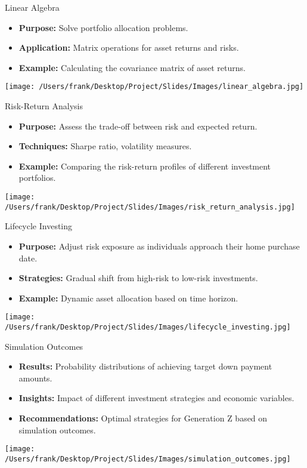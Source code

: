 \documentclass{beamer}
\begin{document}
\begin{frame}{Linear Algebra}
    \begin{itemize}
        \item \textbf{Purpose:} Solve portfolio allocation problems.
        \item \textbf{Application:} Matrix operations for asset returns and risks.
        \item \textbf{Example:} Calculating the covariance matrix of asset returns.
    \end{itemize}
    \centering
    \texttt{[image: /Users/frank/Desktop/Project/Slides/Images/linear\_algebra.jpg]}
\end{frame}

\begin{frame}{Risk-Return Analysis}
    \begin{itemize}
        \item \textbf{Purpose:} Assess the trade-off between risk and expected return.
        \item \textbf{Techniques:} Sharpe ratio, volatility measures.
        \item \textbf{Example:} Comparing the risk-return profiles of different investment portfolios.
    \end{itemize}
    \centering
    \texttt{[image: /Users/frank/Desktop/Project/Slides/Images/risk\_return\_analysis.jpg]}
\end{frame}

\begin{frame}{Lifecycle Investing}
    \begin{itemize}
        \item \textbf{Purpose:} Adjust risk exposure as individuals approach their home purchase date.
        \item \textbf{Strategies:} Gradual shift from high-risk to low-risk investments.
        \item \textbf{Example:} Dynamic asset allocation based on time horizon.
    \end{itemize}
    \centering
    \texttt{[image: /Users/frank/Desktop/Project/Slides/Images/lifecycle\_investing.jpg]}
\end{frame}

\begin{frame}{Simulation Outcomes}
    \begin{itemize}
        \item \textbf{Results:} Probability distributions of achieving target down payment amounts.
        \item \textbf{Insights:} Impact of different investment strategies and economic variables.
        \item \textbf{Recommendations:} Optimal strategies for Generation Z based on simulation outcomes.
    \end{itemize}
    \centering
    \texttt{[image: /Users/frank/Desktop/Project/Slides/Images/simulation\_outcomes.jpg]}
\end{frame}
\end{document}
